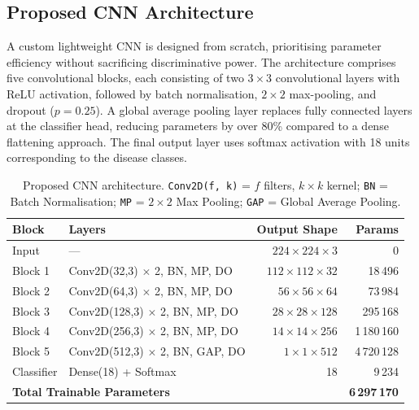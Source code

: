 \documentclass[11pt,a4paper]{article}
\begin{document}
\subsection{Proposed CNN Architecture}

A custom lightweight CNN is designed from scratch, prioritising parameter
efficiency without sacrificing discriminative power. The architecture
comprises five convolutional blocks, each consisting of two $3 \times 3$
convolutional layers with ReLU activation, followed by batch normalisation,
$2 \times 2$ max-pooling, and dropout ($p = 0.25$). A global average pooling
layer replaces fully connected layers at the classifier head, reducing
parameters by over 80\% compared to a dense flattening approach. The final
output layer uses softmax activation with 18 units corresponding to the
disease classes.

\begin{table}[H]
  \centering
  \caption{Proposed CNN architecture. \texttt{Conv2D(f, k)} = $f$ filters,
           $k \times k$ kernel; \texttt{BN} = Batch Normalisation;
           \texttt{MP} = $2 \times 2$ Max Pooling; \texttt{GAP} = Global
           Average Pooling.}
  \label{tab:architecture}
  \begin{tabular}{@{}llrr@{}}
    \toprule
    \textbf{Block} & \textbf{Layers} & \textbf{Output Shape} & \textbf{Params} \\
    \midrule
    Input      & ---                                    & $224 \times 224 \times 3$  & 0 \\
    Block 1    & Conv2D(32,3) $\times$ 2, BN, MP, DO   & $112 \times 112 \times 32$ & 18\,496 \\
    Block 2    & Conv2D(64,3) $\times$ 2, BN, MP, DO   & $56 \times 56 \times 64$   & 73\,984 \\
    Block 3    & Conv2D(128,3) $\times$ 2, BN, MP, DO  & $28 \times 28 \times 128$  & 295\,168 \\
    Block 4    & Conv2D(256,3) $\times$ 2, BN, MP, DO  & $14 \times 14 \times 256$  & 1\,180\,160 \\
    Block 5    & Conv2D(512,3) $\times$ 2, BN, GAP, DO & $1 \times 1 \times 512$     & 4\,720\,128 \\
    Classifier & Dense(18) + Softmax                   & 18                        & 9\,234 \\
    \midrule
    \multicolumn{3}{l}{\textbf{Total Trainable Parameters}} & \textbf{6\,297\,170} \\
    \bottomrule
  \end{tabular}
\end{table}
\end{document}
